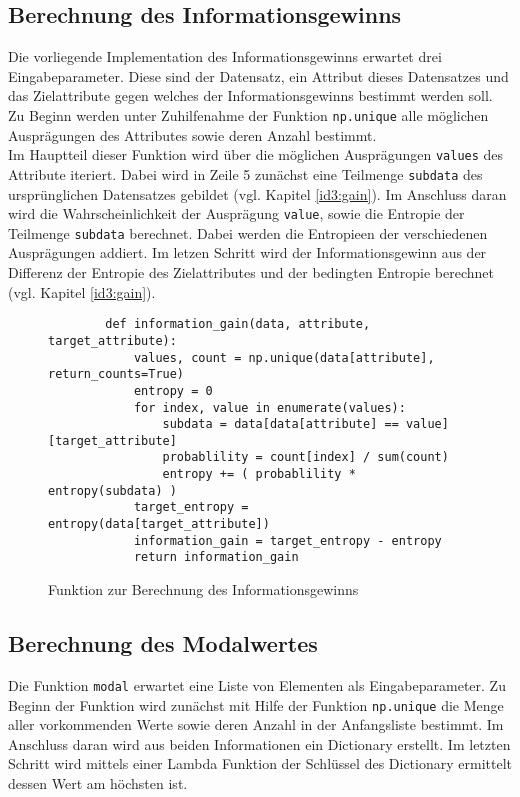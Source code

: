 \subsection{Berechnung des Informationsgewinns}
\label{id3:implementation-ig}
Die vorliegende Implementation des Informationsgewinns erwartet drei Eingabeparameter. Diese sind der Datensatz, ein Attribut dieses Datensatzes und das Zielattribute gegen welches der Informationsgewinns bestimmt werden soll. Zu Beginn werden unter Zu­hil­fe­nah­me der Funktion \texttt{np.unique} alle möglichen Ausprägungen des Attributes sowie deren Anzahl bestimmt.\\
Im Hauptteil dieser Funktion wird über die möglichen Ausprägungen \texttt{values} des Attribute iteriert. Dabei wird in Zeile 5 zunächst eine Teilmenge \texttt{subdata} des ursprünglichen Datensatzes gebildet (vgl. Kapitel \ref{id3:gain}). Im Anschluss daran wird die Wahrscheinlichkeit der Ausprägung \texttt{value}, sowie die Entropie der Teilmenge \texttt{subdata} berechnet. Dabei werden die Entropieen der verschiedenen Ausprägungen addiert. Im letzen Schritt wird der Informationsgewinn aus der Differenz der Entropie des Zielattributes und der bedingten Entropie berechnet (vgl. Kapitel \ref{id3:gain}).

\begin{figure}[htbp]
    \begin{verbatim}
        def information_gain(data, attribute, target_attribute):
            values, count = np.unique(data[attribute], return_counts=True)
            entropy = 0
            for index, value in enumerate(values):
                subdata = data[data[attribute] == value][target_attribute]
                probablility = count[index] / sum(count)
                entropy += ( probablility * entropy(subdata) )
            target_entropy = entropy(data[target_attribute])
            information_gain = target_entropy - entropy
            return information_gain
    \end{verbatim}
    \caption{Funktion zur Berechnung des Informationsgewinns \autocites{PythonCourseDecisionTrees:online}{ImplementationID3}}
\end{figure}

\subsection{Berechnung des Modalwertes}
\label{id3:implementation-modal}
Die Funktion \texttt{modal} erwartet eine Liste von Elementen als Eingabeparameter. Zu Beginn der Funktion wird zunächst mit Hilfe der Funktion \texttt{np.unique} die Menge aller vorkommenden Werte sowie deren Anzahl in der Anfangsliste bestimmt. Im Anschluss daran wird aus beiden Informationen ein Dictionary erstellt. Im letzten Schritt wird mittels einer Lambda Funktion der Schlüssel des Dictionary ermittelt dessen Wert am höchsten ist.

